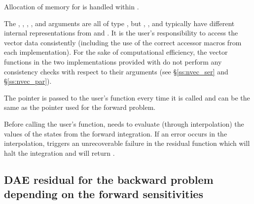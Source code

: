 {
  Allocation of memory for  is handled within {\idas}.

  The , , , , and  arguments are all
  of type , but , , and  typically have
  different internal representations from  and .  It is the user's
  responsibility to access the vector data consistently (including the use of the
  correct accessor macros from each {\nvector} implementation). For the sake of
  computational efficiency, the vector functions in the two {\nvector} implementations
  provided with {\idas} do not perform any consistency checks with respect to their
   arguments (see \S\ref{ss:nvec_ser} and \S\ref{ss:nvec_par}).

  The  pointer is passed to
  the user's  function every time it is called and can be the same as the
   pointer used for the forward problem.

  {\warn}Before calling the user's  function, {\idas} needs to evaluate
  (through interpolation) the values of the states from the forward integration.
  If an error occurs in the interpolation, {\idas} triggers an unrecoverable
  failure in the residual function which will halt the integration and
   will return .
}

\subsection{DAE residual for the backward problem depending on the forward sensitivities}\label{ss:DAEres_bs}

